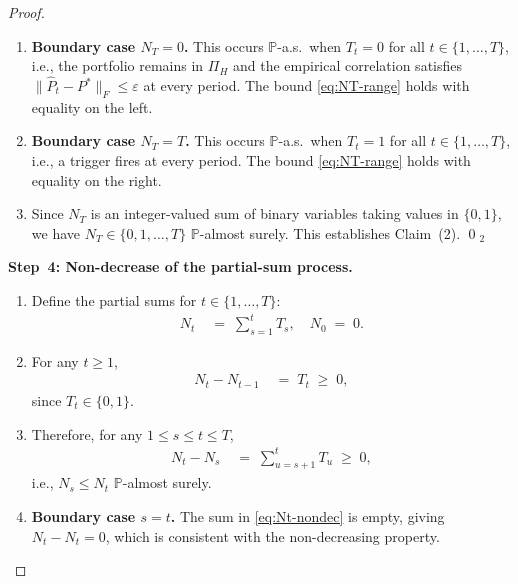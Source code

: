 \documentclass[12pt,openany]{book}
\numberwithin{equation}{chapter}
\theoremstyle{plain}
\theoremstyle{definition}
\theoremstyle{remark}
\begin{document}
\begin{proof}
\begin{enumerate}
  \item \textbf{Boundary case $N_T = 0$.}  This occurs
        $\mathbb{P}$-a.s.\ when $T_t = 0$ for all
        $t \in \{1,\ldots,T\}$, i.e., the portfolio remains in
        $\Pi_H$ and the empirical correlation satisfies
        $\|\hat{P}_t - P^*\|_F \leq \varepsilon$ at every period.
        The bound \eqref{eq:NT-range} holds with equality on the
        left.

  \item \textbf{Boundary case $N_T = T$.}  This occurs
        $\mathbb{P}$-a.s.\ when $T_t = 1$ for all
        $t \in \{1,\ldots,T\}$, i.e., a trigger fires at every
        period.  The bound \eqref{eq:NT-range} holds with equality
        on the right.

  \item Since $N_T$ is an integer-valued sum of binary variables
        taking values in $\{0,1\}$, we have
        $N_T \in \{0,1,\ldots,T\}$ $\mathbb{P}$-almost surely.
        This establishes Claim~(2). \qed$_2$
\end{enumerate}

\medskip
\noindent\textbf{Step~4: Non-decrease of the partial-sum process.}
\begin{enumerate}
  \item Define the partial sums for $t \in \{1,\ldots,T\}$:
        \begin{align}
          N_t &\;=\; \sum_{s=1}^{t} T_s, \quad N_0 \;=\; 0.
          \label{eq:Nt-def}
        \end{align}

  \item For any $t \geq 1$,
        \begin{align}
          N_t - N_{t-1}
          &\;=\; T_t \;\geq\; 0,
          \label{eq:Nt-increment}
        \end{align}
        since $T_t \in \{0,1\}$.

  \item Therefore, for any $1 \leq s \leq t \leq T$,
        \begin{align}
          N_t - N_s
          &\;=\; \sum_{u=s+1}^{t} T_u \;\geq\; 0,
          \label{eq:Nt-nondec}
        \end{align}
        i.e., $N_s \leq N_t$ $\mathbb{P}$-almost surely.

  \item \textbf{Boundary case $s = t$.}  The sum in
        \eqref{eq:Nt-nondec} is empty, giving $N_t - N_t = 0$,
        which is consistent with the non-decreasing property.


\end{enumerate}
\end{proof}
\end{document}
